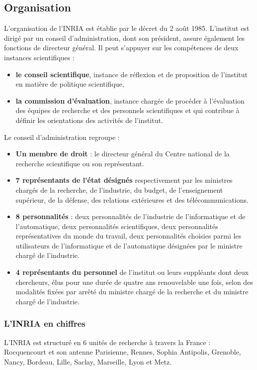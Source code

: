 \documentclass[a4paper, 11pt]{report}
\begin{document}
    \subsection{Organisation}
    L'organisation de l'INRIA est établie par le décret du 2 août 1985.
    L'institut est dirigé par un conseil d'administration, dont son
    président, assure également les fonctions de directeur général.
    Il peut s'appuyer sur les compétences de deux instances scientifiques :
    \begin{itemize}
      \item \textbf{le conseil scientifique}, instance de réflexion et de
      proposition de l'institut en matière de politique scientifique,
      \item \textbf{la commission d’évaluation}, instance chargée de procéder à
      l'évaluation des équipes de recherche et des personnels scientifiques
      et qui contribue à définir les orientations des activités de l'institut.
    \end{itemize}

    Le conseil d'administration regroupe :
    \begin{itemize}
      \item \textbf{Un membre de droit} : le directeur général du Centre national de
        la recherche scientifique ou son représentant.
      \item \textbf{7 représentants de l'état désignés} respectivement par les
        ministres chargés de la recherche, de l'industrie, du budget, de
        l'enseignement supérieur, de la défense, des relations extérieures et
        des télécommunications.
      \item \textbf{8 personnalités} : deux personnalités de l'industrie de
        l'informatique et de l'automatique, deux personnalités scientifiques,
        deux personnalités représentatives du monde du travail, deux
        personnalités choisies parmi les utilisateurs de l'informatique et de
        l'automatique désignées par le ministre chargé de l'industrie.
      \item \textbf{4 représentants du personnel} de l'institut ou leurs
        suppléants dont deux chercheurs, élus pour une durée de quatre ans
        renouvelable une fois, selon des modalités fixées par arrêté du
        ministre chargé de la recherche et du ministre chargé de l'industrie. \\
    \end{itemize}

    \subsubsection{L'INRIA en chiffres}
    L'INRIA est structuré en 6 unités de recherche à travers la France :
    Rocquencourt et son antenne Parisienne, Rennes, Sophia Antipolis, Grenoble,
    Nancy, Bordeau, Lille, Saclay, Marseille, Lyon et Metz. \\
\end{document}
